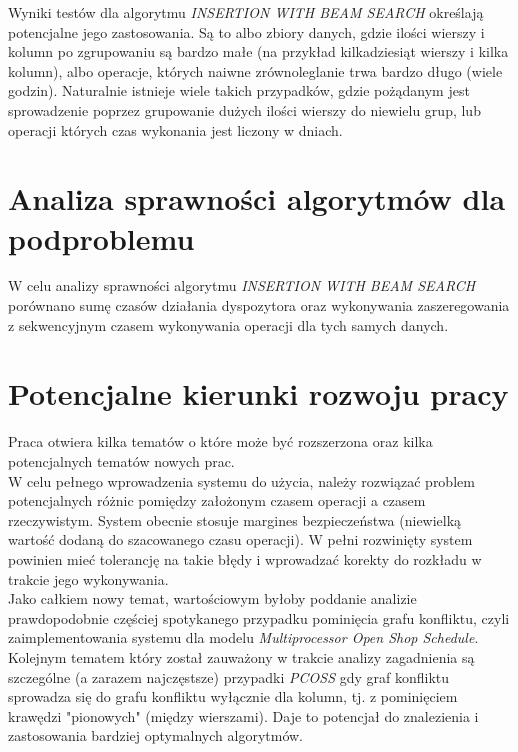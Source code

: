 \documentclass[brudnopis]{xmgr}
\begin{document}
Wyniki testów dla algorytmu \emph{INSERTION WITH BEAM SEARCH} określają potencjalne jego zastosowania. Są to albo zbiory danych, gdzie ilości wierszy i kolumn po zgrupowaniu są bardzo małe (na przykład kilkadziesiąt wierszy i kilka kolumn), albo operacje, których naiwne zrównoleglanie trwa bardzo długo (wiele godzin). Naturalnie istnieje wiele takich przypadków, gdzie pożądanym jest sprowadzenie poprzez grupowanie dużych ilości wierszy do niewielu grup, lub operacji których czas wykonania jest liczony w dniach.

\chapter{Analiza sprawności algorytmów dla podproblemu}

W celu analizy sprawności algorytmu \emph{INSERTION WITH BEAM SEARCH} porównano sumę czasów działania dyspozytora oraz wykonywania zaszeregowania z sekwencyjnym czasem wykonywania operacji dla tych samych danych.

\chapter{Potencjalne kierunki rozwoju pracy} \label{chap:extend}

Praca otwiera kilka tematów o które może być rozszerzona oraz kilka potencjalnych tematów nowych prac.
\medskip\\

W celu pełnego wprowadzenia systemu do użycia, należy rozwiązać problem potencjalnych różnic pomiędzy założonym czasem operacji a czasem rzeczywistym. System obecnie stosuje margines bezpieczeństwa (niewielką wartość dodaną do szacowanego czasu operacji).
W pełni rozwinięty system powinien mieć tolerancję na takie błędy i wprowadzać korekty do rozkładu w trakcie jego wykonywania.
\medskip\\

Jako całkiem nowy temat, wartościowym byłoby poddanie analizie prawdopodobnie częściej spotykanego przypadku pominięcia grafu konfliktu, czyli zaimplementowania systemu dla modelu \emph{Multiprocessor Open Shop Schedule}.
\medskip\\

Kolejnym tematem który został zauważony w trakcie analizy zagadnienia są szczególne (a zarazem najczęstsze) przypadki \emph{PCOSS} gdy graf konfliktu sprowadza się do grafu konfliktu wyłącznie dla kolumn, tj. z pominięciem krawędzi "pionowych" (między wierszami). Daje to potencjał do znalezienia i zastosowania bardziej optymalnych algorytmów.
\medskip\\
\end{document}
